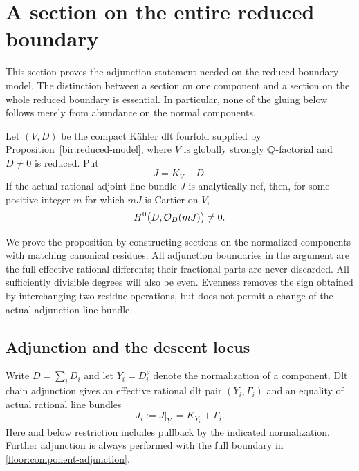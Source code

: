 \section{A section on the entire reduced boundary}
\label{floor:sec}

This section proves the adjunction statement needed on the reduced-boundary
model.  The distinction between a section on one component and a section on
the whole reduced boundary is essential.  In particular, none of the gluing
below follows merely from abundance on the normal components.

\begin{proposition}
\label{floor:section}
Let $(V,D)$ be the compact K\"ahler dlt fourfold supplied by
Proposition~\ref{bir:reduced-model}, where $V$ is globally strongly
$\mathbb{Q}$-factorial and $D\ne0$ is reduced.  Put
\[
 J=K_V+D.
\]
If the actual rational adjoint line bundle $J$ is analytically nef, then,
for some positive integer $m$ for which $mJ$ is Cartier on $V$,
\begin{equation}
 \label{floor:goal}
 H^0\bigl(D,\mathcal{O}_D(mJ)\bigr)\ne0.
\end{equation}
\end{proposition}

We prove the proposition by constructing sections on the normalized
components with matching canonical residues.  All adjunction boundaries
in the argument are the full effective rational differents; their
fractional parts are never discarded.  All sufficiently divisible degrees
will also be even.  Evenness removes the sign obtained by interchanging
two residue operations, but does not permit a change of the actual
adjunction line bundle.

\subsection{Adjunction and the descent locus}

Write $D=\sum_iD_i$ and let $Y_i=D_i^\nu$ denote the normalization of a
component.  Dlt chain adjunction gives an effective rational dlt pair
$(Y_i,\Gamma_i)$ and an equality of actual rational line bundles
\begin{equation}
 \label{floor:component-adjunction}
 J_i:=J|_{Y_i}=K_{Y_i}+\Gamma_i.
\end{equation}
Here and below restriction includes pullback by the indicated
normalization.  Further adjunction is always performed with the full
boundary in \eqref{floor:component-adjunction}.

